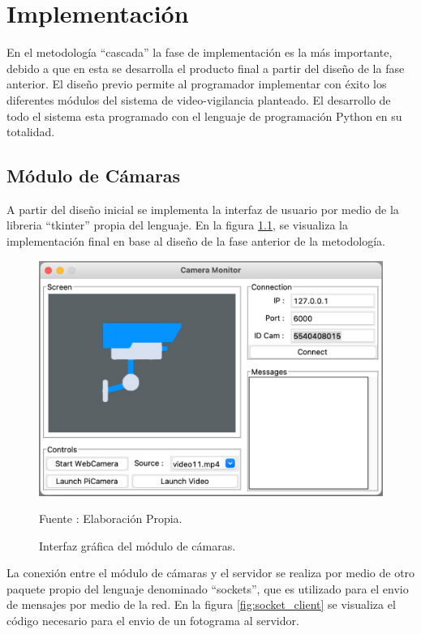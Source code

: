 \chapter{Implementación}
En el metodología ``cascada'' la fase de implementación es la más importante, debido a que en esta se desarrolla el producto final a partir del diseño de la fase anterior. El diseño previo permite al programador implementar con éxito los diferentes módulos del sistema de video-vigilancia planteado. El desarrollo de todo el sistema esta programado con el lenguaje de programación Python en su totalidad.

\section{Módulo de Cámaras}
A partir del diseño inicial se implementa la interfaz de usuario por medio de la libreria ``tkinter'' propia del lenguaje. En la figura \ref{fig:camera_screen}, se visualiza la implementación final en base al diseño de la fase anterior de la metodología.

\begin{figure}[H]
    \begin{center}
        \includegraphics[width=12cm]{img/capitulo_5/camera_interface.png}        
    \end{center}
    \begin{center}
        \caption{Interfaz gráfica del módulo de cámaras.}
        Fuente : Elaboración Propia.
        \label{fig:camera_screen}
    \end{center}
    
\end{figure}

La conexión entre el módulo de cámaras y el servidor se realiza por medio de otro paquete propio del lenguaje denominado ``sockets'', que es utilizado para el envio de mensajes por medio de la red. En la figura \ref{fig:socket_client} se visualiza el código necesario para el envio de un fotograma al servidor.

